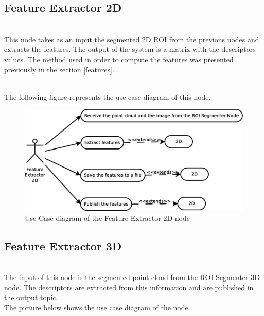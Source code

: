 \subsection{Feature Extractor 2D}\\
	This node takes as an input the segmented 2D ROI from the previous nodes and extracts the features. The output of the system is a matrix with the descriptors values. The method used in order to compute the features was presented previously in the section  \ref{features}.

	\\

	The following figure represents the use case diagram of this node. 
	\begin{figure}[h]
		\begin{center}
			\includegraphics[scale=0.2]{img/diagrams/uc_feature_extractor_2d.eps}
			\caption[Use case diagram Feature Extractor 2D node]{Use Case diagram of the Feature Extractor 2D node}
		\end{center}
	\end{figure}

\subsection{Feature Extractor 3D}\\
	The input of this node is the segmented point cloud from the ROI Segmenter 3D node. The descriptors are extracted from this information and are published in the output topic. 
	\\

	The picture below shows the use case diagram of the node. 


